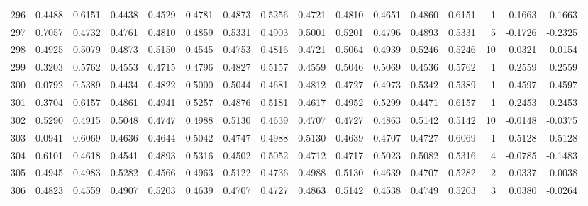 \begin{tabular}{lrrrrrrrrrrrrrrr}
296 &      0.4488 &  0.6151 &  0.4438 &  0.4529 &  0.4781 &  0.4873 &  0.5256 &  0.4721 &  0.4810 &  0.4651 &   0.4860 &     0.6151 &      1 &                    0.1663 &                     0.1663 \\
297 &      0.7057 &  0.4732 &  0.4761 &  0.4810 &  0.4859 &  0.5331 &  0.4903 &  0.5001 &  0.5201 &  0.4796 &   0.4893 &     0.5331 &      5 &                   -0.1726 &                    -0.2325 \\
298 &      0.4925 &  0.5079 &  0.4873 &  0.5150 &  0.4545 &  0.4753 &  0.4816 &  0.4721 &  0.5064 &  0.4939 &   0.5246 &     0.5246 &     10 &                    0.0321 &                     0.0154 \\
299 &      0.3203 &  0.5762 &  0.4553 &  0.4715 &  0.4796 &  0.4827 &  0.5157 &  0.4559 &  0.5046 &  0.5069 &   0.4536 &     0.5762 &      1 &                    0.2559 &                     0.2559 \\
300 &      0.0792 &  0.5389 &  0.4434 &  0.4822 &  0.5000 &  0.5044 &  0.4681 &  0.4812 &  0.4727 &  0.4973 &   0.5342 &     0.5389 &      1 &                    0.4597 &                     0.4597 \\
301 &      0.3704 &  0.6157 &  0.4861 &  0.4941 &  0.5257 &  0.4876 &  0.5181 &  0.4617 &  0.4952 &  0.5299 &   0.4471 &     0.6157 &      1 &                    0.2453 &                     0.2453 \\
302 &      0.5290 &  0.4915 &  0.5048 &  0.4747 &  0.4988 &  0.5130 &  0.4639 &  0.4707 &  0.4727 &  0.4863 &   0.5142 &     0.5142 &     10 &                   -0.0148 &                    -0.0375 \\
303 &      0.0941 &  0.6069 &  0.4636 &  0.4644 &  0.5042 &  0.4747 &  0.4988 &  0.5130 &  0.4639 &  0.4707 &   0.4727 &     0.6069 &      1 &                    0.5128 &                     0.5128 \\
304 &      0.6101 &  0.4618 &  0.4541 &  0.4893 &  0.5316 &  0.4502 &  0.5052 &  0.4712 &  0.4717 &  0.5023 &   0.5082 &     0.5316 &      4 &                   -0.0785 &                    -0.1483 \\
305 &      0.4945 &  0.4983 &  0.5282 &  0.4566 &  0.4963 &  0.5122 &  0.4736 &  0.4988 &  0.5130 &  0.4639 &   0.4707 &     0.5282 &      2 &                    0.0337 &                     0.0038 \\
306 &      0.4823 &  0.4559 &  0.4907 &  0.5203 &  0.4639 &  0.4707 &  0.4727 &  0.4863 &  0.5142 &  0.4538 &   0.4749 &     0.5203 &      3 &                    0.0380 &                    -0.0264 \\

\end{tabular}
